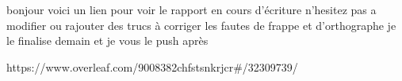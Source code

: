 
bonjour voici un lien pour voir le rapport en cours d'écriture
n'hesitez pas a  modifier ou rajouter des trucs
à corriger les fautes de frappe et d'orthographe
je le finalise demain et je vous le push après


https://www.overleaf.com/9008382chfstsnkrjcr#/32309739/